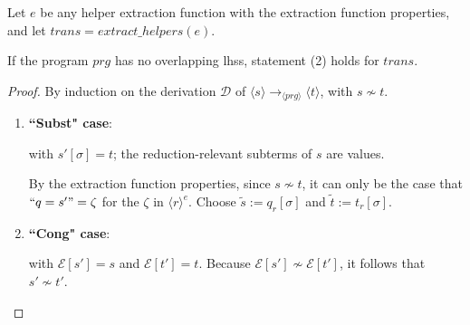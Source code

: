 \begin{proposition}

Let $e$ be any helper extraction function with the extraction function properties, and let $trans = extract\_helpers(e)$.

If the program $prg$ has no overlapping lhss, statement (2) holds for $trans$.

\begin{proof} By induction on the derivation $\mathcal{D}$ of $\langle s \rangle \longrightarrow_{\langle prg \rangle} \langle t \rangle$, with $s \not\sim t$.

\begin{enumerate}
\item \textbf{``Subst" case}:

\begin{prooftree}
\end{prooftree}

with $s'[\sigma] = t$; the reduction-relevant subterms of $s$ are values.

By the extraction function properties, since $s \not\sim t$, it can only be the case that $`` q = s' " = \zeta$ for the $\zeta$ in $\langle r \rangle^e$. Choose $\widetilde{s} := q_r[\sigma]$ and $\widetilde{t} := t_r[\sigma]$.

\item \textbf{``Cong" case}:

\begin{prooftree}
\end{prooftree}

with $\mathcal{E}[s'] = s$ and $\mathcal{E}[t'] = t$. Because $\mathcal{E}[s'] \not\sim \mathcal{E}[t']$, it follows that $s' \not\sim t'$.


\end{enumerate}
\end{proof}
\end{proposition}
